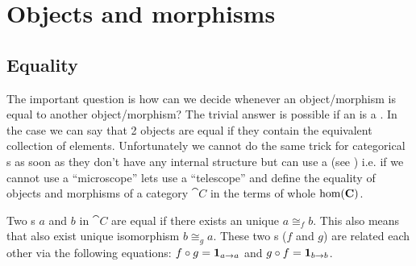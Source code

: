\chapter{Objects and morphisms}

\section{Equality}

The important question is how can we decide whenever an
object/morphism is equal to another object/morphism? The trivial
answer is possible if an  is a
. In the case we can say that 2 objects are equal
if they contain the equivalent collection of elements. Unfortunately
we cannot do the same trick for categorical s as
soon as they don't have any internal 
structure but can use a  (see 
) i.e. if we cannot use a ``microscope'' lets
use a ``telescope'' and define the equality of objects and morphisms of
a category $\cat{C}$ in the terms of whole $\mathrm{hom}(\mathbf{C})$.

\begin{definition}
\label{def:object_equality}
Two s $a$ and $b$ in 
$\cat{C}$ are equal if there exists an unique
 $a \cong_f b$. This also means that
also exist unique isomorphism $b \cong_g a$. These two
s ($f$ and $g$) are related each other via 
the following equations: $f \circ g = \mathbf{1}_{ a \to a }$ and $g \circ f
= \mathbf{1}_{ b \to b }$. 
\end{definition}

